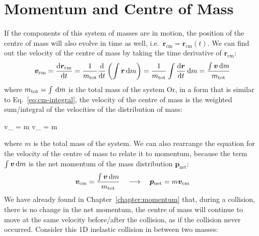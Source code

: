 \section{Momentum and Centre of Mass}

If the components of this system of masses are in motion, the position of the
centre of mass will also evolve in time as well, i.e.\
$\bm r_\text{cm}=\bm r_\text{cm}(t)$. We can find out the velocity of the centre
of mass by taking the time derivative of $\bm r_\text{cm}$:
\begin{equation}
  \bm v_\text{cm}=\diff{\bm r_\text{cm}}t
  =\frac1{m_\text{tot}}\diff{}t\left(\int\bm r\dl m\right)
  =\frac1{m_\text{tot}}\int\diff{\bm r}t\dl m
  =\frac{\int\bm v\dl m}{m_\text{tot}}
\end{equation}
where $m_\text{tot}=\int\dl m$ is the total mass of the system
Or, in a form that is similar to Eq.~\ref{eq:cm-integral}, the velocity of the
centre of mass is the weighted sum/integral of the velocities of the distribution of
mass:
\begin{important-equation}
  \bm v_ = m
  \quad{}\quad
  \bm v_ = m
\end{important-equation}
where $m$ is the total mass of the system. We can also rearrange the equation
for the velocity of the centre of mass to relate it to momentum, because the
term $\int\bm v\dl m$ is the net momentum of the mass distribution
$\bm p_\text{net}$:
\begin{equation}
  \bm v_\text{cm} = \frac{\int\bm v\dl m}{m_\text{tot}}
  \quad\longrightarrow\quad
  \bm p_\text{net}=m\bm v_\text{cm}
  \label{eq:mv-cm}
\end{equation}
We have already found in Chapter~\ref{chapter:momentum} that, during a
collision, there is no change in the net momentum,
the centre of mass will continue to move at the same velocity before/after the
collision, as if the collision never occurred.
Consider this 1D inelastic collision in between two masses:
